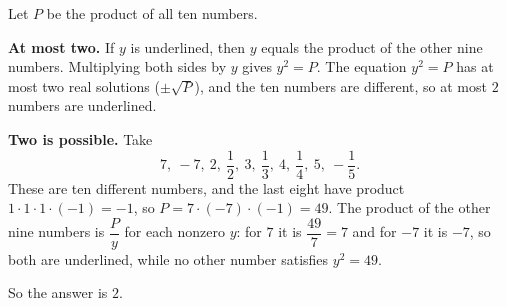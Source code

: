 Let $P$ be the product of all ten numbers.

\textbf{At most two.} If $y$ is underlined, then $y$ equals the product of the other nine numbers. Multiplying both sides by $y$ gives $y^2=P$. The equation $y^2=P$ has at most two real solutions ($\pm\sqrt P$), and the ten numbers are different, so at most $2$ numbers are underlined.

\textbf{Two is possible.} Take
\[7,\ -7,\ 2,\ \dfrac12,\ 3,\ \dfrac13,\ 4,\ \dfrac14,\ 5,\ -\dfrac15.\]
These are ten different numbers, and the last eight have product $1\cdot1\cdot1\cdot(-1)=-1$, so $P=7\cdot(-7)\cdot(-1)=49$. The product of the other nine numbers is $\dfrac{P}{y}$ for each nonzero $y$: for $7$ it is $\dfrac{49}{7}=7$ and for $-7$ it is $-7$, so both are underlined, while no other number satisfies $y^2=49$.

So the answer is $\boxed{2}$.

